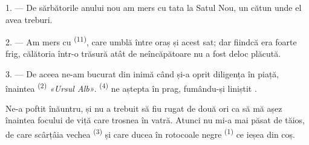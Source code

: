 %
%


\VUsaut{4.0mm}
\VUsaut{3.0mm}
\VUfilet{16mm}
\VUsaut{5.6mm}
\VUsaut{3.0mm}

\VUsaut{3.0mm}

\VUsaut{4.0mm}

1. --- De sărbătorile anului nou am mers cu tata la Satul Nou, un cătun unde el
avea treburi.

2. --- Am mers cu  \textsuperscript{(11)}, care umblă între oraș
și acest sat; dar fiindcă era foarte frig, călătoria într-o trăsură atât de
neîncăpătoare nu a fost deloc plăcută.

3. --- De aceea ne-am bucurat din inimă când  și-a oprit diligența
în piață, înaintea  \textsuperscript{(2)} \textit{«Ursul Alb»}.
 \textsuperscript{(4)} ne aștepta în prag, fumându-și liniștit
.

Ne-a poftit înăuntru, și nu a trebuit să fiu rugat de două ori ca să mă așez
înaintea focului de viță care trosnea în vatră. Atunci nu mi-a mai păsat de
 tăios, de care scârțâia vechea 
\textsuperscript{(3)} și care ducea în rotocoale negre 
\textsuperscript{(1)} ce ieșea din coș.

